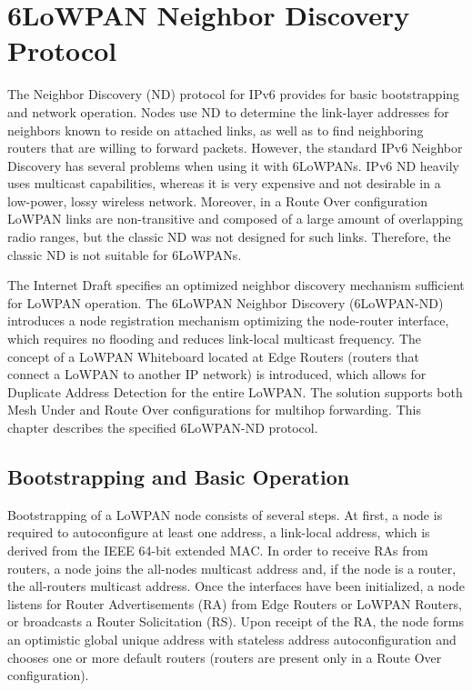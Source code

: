 \chapter{6LoWPAN Neighbor Discovery Protocol}\label{ch:nd}
The Neighbor Discovery (ND) protocol for IPv6 \cite{rfc4861} provides for basic bootstrapping and network operation. Nodes use ND to determine the link-layer addresses for neighbors known to reside on attached links, as well as to find neighboring routers that are willing to forward packets. However, the standard IPv6 Neighbor Discovery has several problems when using it with 6LoWPANs. IPv6 ND heavily uses multicast capabilities, whereas it is very expensive and not desirable in a low-power, lossy wireless network. Moreover, in a Route Over configuration LoWPAN links are non-transitive and composed of a large amount of overlapping radio ranges, but the classic ND was not designed for such links. Therefore, the classic ND is not suitable for 6LoWPANs. 

The Internet Draft \cite{draft-nd-07} specifies an optimized neighbor discovery mechanism sufficient for LoWPAN operation. The 6LoWPAN Neighbor Discovery (6LoWPAN-ND) introduces a node registration mechanism optimizing the node-router interface, which requires no flooding and reduces link-local multicast frequency.  The concept of a LoWPAN Whiteboard located at Edge Routers (routers that connect a LoWPAN to another IP network) is introduced, which allows for Duplicate Address Detection for the entire LoWPAN. The solution supports both Mesh Under and Route Over configurations for multihop forwarding. This chapter describes the specified 6LoWPAN-ND protocol.


\section{Bootstrapping and Basic Operation}
Bootstrapping of a LoWPAN node consists of several steps.  At first, a node is required to autoconfigure at least one address, a link-local address, which is derived from the IEEE 64-bit extended MAC. In order to receive RAs from routers, a node joins the all-nodes multicast address and, if the node is a router, the all-routers multicast address. Once the interfaces have been initialized, a node listens for Router Advertisements (RA) from Edge Routers or LoWPAN Routers, or broadcasts a Router Solicitation (RS). Upon receipt of the RA, the node forms an optimistic global unique address with stateless address autoconfiguration and chooses one or more default routers (routers are present only in a Route Over configuration). 

